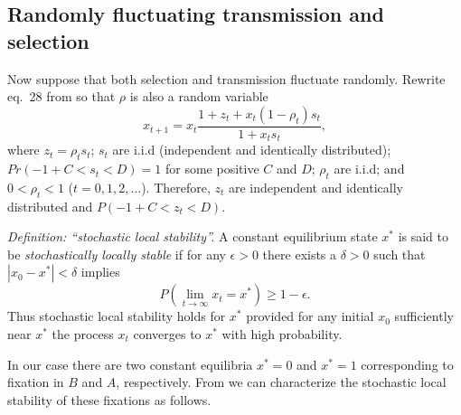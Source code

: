 \documentclass[14pt]{extarticle}
\begin{document}
\subsection*{Randomly fluctuating transmission and selection}

Now suppose that both selection and transmission fluctuate randomly.
Rewrite eq.~28 from \citet{Ram2018} so that $\rho$ is also a random variable
\begin{equation}
x_{t+1} = x_t \frac{1 + z_t + x_t (1 - \rho_t) s_t}{1 + x_t s_t},
\end{equation}
where $z_t=\rho_t s_t$; $s_t$ are i.i.d (independent and identically distributed); $Pr(-1+C<s_t<D)=1$ for some positive $C$ and $D$; $\rho_t$ are i.i.d; and  $0<\rho_t<1$ ($t=0,1,2,\ldots$).
Therefore, $z_t$ are independent and identically distributed and $P(-1+C < z_t < D)$. 

{\it Definition: ``stochastic local stability''.}
A constant equilibrium state $x^*$ is said to be \emph{stochastically locally stable} if for any $\epsilon>0$ there exists a $\delta>0$ such that $|x_0-x^*|<\delta$ implies
\begin{equation}
P(\lim_{t \to \infty}x_t = x^*) \ge 1-\epsilon.
\end{equation}
Thus stochastic local stability holds for $x^*$ provided for any initial $x_0$ sufficiently near $x^*$ the process $x_t$ converges to $x^*$ with high probability.

In our case there are two constant equilibria $x^*=0$ and $x^*=1$ corresponding to fixation in $B$ and $A$, respectively.
From \citet[][results~6 and 7]{Ram2018} we can characterize the stochastic local stability of these fixations as follows.
\end{document}
